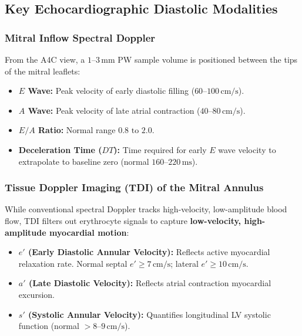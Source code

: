 \documentclass[11pt,a4paper]{article}
\begin{document}
\subsection{Key Echocardiographic Diastolic Modalities}

\subsubsection{Mitral Inflow Spectral Doppler}
From the A4C view, a $1\text{--}3\,\text{mm}$ PW sample volume is positioned between the tips of the mitral leaflets:
\begin{itemize}[leftmargin=*]
    \item \textbf{$E$ Wave:} Peak velocity of early diastolic filling ($60\text{--}100\,\text{cm/s}$).
    \item \textbf{$A$ Wave:} Peak velocity of late atrial contraction ($40\text{--}80\,\text{cm/s}$).
    \item \textbf{$E/A$ Ratio:} Normal range $0.8\text{ to }2.0$.
    \item \textbf{Deceleration Time ($DT$):} Time required for early $E$ wave velocity to extrapolate to baseline zero (normal $160\text{--}220\,\text{ms}$).
\end{itemize}

\subsubsection{Tissue Doppler Imaging (TDI) of the Mitral Annulus}
While conventional spectral Doppler tracks high-velocity, low-amplitude blood flow, TDI filters out erythrocyte signals to capture \textbf{low-velocity, high-amplitude myocardial motion}:
\begin{itemize}[leftmargin=*]
    \item \textbf{$e'$ (Early Diastolic Annular Velocity):} Reflects active myocardial relaxation rate. Normal septal $e' \ge 7\,\text{cm/s}$; lateral $e' \ge 10\,\text{cm/s}$.
    \item \textbf{$a'$ (Late Diastolic Velocity):} Reflects atrial contraction myocardial excursion.
    \item \textbf{$s'$ (Systolic Annular Velocity):} Quantifies longitudinal LV systolic function (normal $> 8\text{--}9\,\text{cm/s}$).
\end{itemize}
\end{document}
